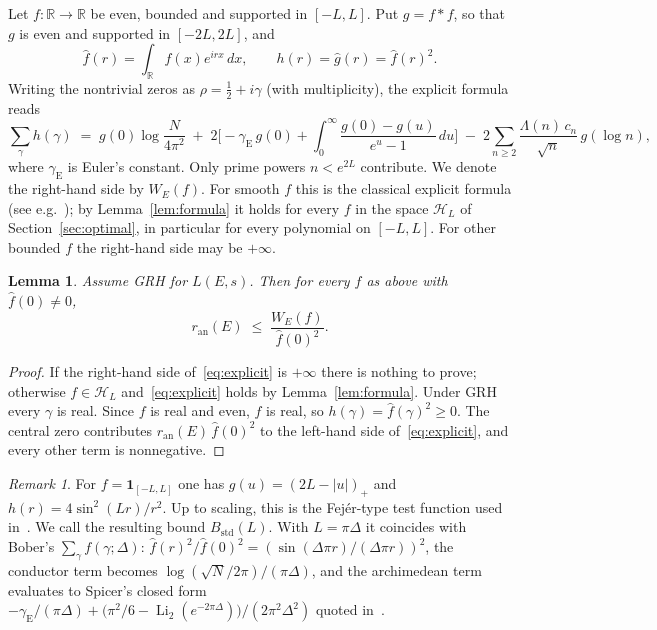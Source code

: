 \documentclass[11pt]{amsart}
\newtheorem{lemma}[theorem]{Lemma}
\theoremstyle{remark}
\newtheorem{remark}[theorem]{Remark}
\theoremstyle{definition}
\newcommand{\R}{\mathbb{R}}
\newcommand{\Hs}{\mathcal{H}_L}
\newcommand{\ran}{r_{\mathrm{an}}}
\begin{document}
Let $f\colon\R\to\R$ be even, bounded and supported in $[-L,L]$. Put $g=f*f$, so that $g$ is even and supported in $[-2L,2L]$, and
\[
\hat f(r)=\int_{\R} f(x)e^{irx}\,dx,\qquad h(r)=\hat g(r)=\hat f(r)^2 .
\]
Writing the nontrivial zeros as $\rho=\tfrac12+i\gamma$ (with multiplicity), the explicit formula reads
\begin{equation}\label{eq:explicit}
\sum_{\gamma} h(\gamma) \;=\; g(0)\log\frac{N}{4\pi^2}
\;+\;2\Big[-\gamma_{\mathrm E}\,g(0)+\int_0^{\infty}\frac{g(0)-g(u)}{e^{u}-1}\,du\Big]
\;-\;2\sum_{n\ge 2}\frac{\Lambda(n)\,c_n}{\sqrt n}\,g(\log n),
\end{equation}
where $\gamma_{\mathrm E}$ is Euler's constant. Only prime powers $n<e^{2L}$ contribute. We denote the right-hand side by $W_E(f)$. For smooth $f$ this is the classical explicit formula (see e.g.~\cite[Thm.~5.12]{IK}); by Lemma~\ref{lem:formula} it holds for every $f$ in the space $\Hs$ of Section~\ref{sec:optimal}, in particular for every polynomial on $[-L,L]$. For other bounded $f$ the right-hand side may be $+\infty$.

\begin{lemma}\label{lem:bound}
Assume GRH for $L(E,s)$. Then for every $f$ as above with $\hat f(0)\ne0$,
\[
\ran(E)\;\le\;\frac{W_E(f)}{\hat f(0)^2}.
\]
\end{lemma}
\begin{proof}
If the right-hand side of~\eqref{eq:explicit} is $+\infty$ there is nothing to prove; otherwise $f\in\Hs$ and~\eqref{eq:explicit} holds by Lemma~\ref{lem:formula}. Under GRH every $\gamma$ is real. Since $f$ is real and even, $\hat f$ is real, so $h(\gamma)=\hat f(\gamma)^2\ge0$. The central zero contributes $\ran(E)\,\hat f(0)^2$ to the left-hand side of~\eqref{eq:explicit}, and every other term is nonnegative.
\end{proof}

\begin{remark}
For $f=\mathbf 1_{[-L,L]}$ one has $g(u)=(2L-|u|)_+$ and $h(r)=4\sin^2(Lr)/r^2$. Up to scaling, this is the Fej\'er-type test function used in~\cite{Bober,KSW}. We call the resulting bound $B_{\mathrm{std}}(L)$. With $L=\pi\Delta$ it coincides with Bober's $\sum_\gamma f(\gamma;\Delta)$: $\hat f(r)^2/\hat f(0)^2=(\sin(\Delta\pi r)/(\Delta\pi r))^2$, the conductor term becomes $\log(\sqrt N/2\pi)/(\pi\Delta)$, and the archimedean term evaluates to Spicer's closed form $-\gamma_{\mathrm E}/(\pi\Delta)+\big(\pi^2/6-\operatorname{Li}_2(e^{-2\pi\Delta})\big)/(2\pi^2\Delta^2)$ quoted in~\cite{KSW}.
\end{remark}
\end{document}
